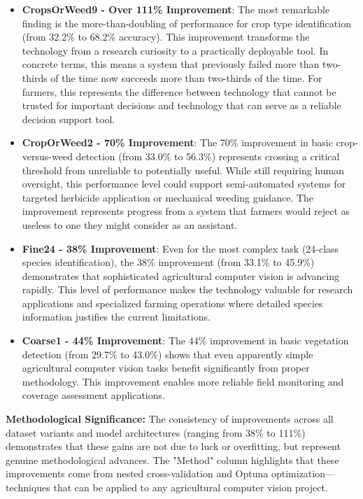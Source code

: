 \begin{itemize}
    \item \textbf{CropsOrWeed9 - Over 111\% Improvement}: The most remarkable finding is the more-than-doubling of performance for crop type identification (from 32.2\% to 68.2\% accuracy). This improvement transforms the technology from a research curiosity to a practically deployable tool. In concrete terms, this means a system that previously failed more than two-thirds of the time now succeeds more than two-thirds of the time. For farmers, this represents the difference between technology that cannot be trusted for important decisions and technology that can serve as a reliable decision support tool.
    
    \item \textbf{CropOrWeed2 - 70\% Improvement}: The 70\% improvement in basic crop-versus-weed detection (from 33.0\% to 56.3\%) represents crossing a critical threshold from unreliable to potentially useful. While still requiring human oversight, this performance level could support semi-automated systems for targeted herbicide application or mechanical weeding guidance. The improvement represents progress from a system that farmers would reject as useless to one they might consider as an assistant.
    
    \item \textbf{Fine24 - 38\% Improvement}: Even for the most complex task (24-class species identification), the 38\% improvement (from 33.1\% to 45.9\%) demonstrates that sophisticated agricultural computer vision is advancing rapidly. This level of performance makes the technology valuable for research applications and specialized farming operations where detailed species information justifies the current limitations.
    
    \item \textbf{Coarse1 - 44\% Improvement}: The 44\% improvement in basic vegetation detection (from 29.7\% to 43.0\%) shows that even apparently simple agricultural computer vision tasks benefit significantly from proper methodology. This improvement enables more reliable field monitoring and coverage assessment applications.
\end{itemize}

\textbf{Methodological Significance:} The consistency of improvements across all dataset variants and model architectures (ranging from 38\% to 111\%) demonstrates that these gains are not due to luck or overfitting, but represent genuine methodological advances. The "Method" column highlights that these improvements come from nested cross-validation and Optuna optimization—techniques that can be applied to any agricultural computer vision project.

